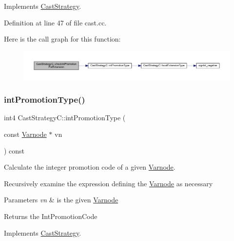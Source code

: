 Implements \mbox{\hyperlink{class_cast_strategy_a1d44ad4691a30115228ae37533d2c38d}{Cast\+Strategy}}.



Definition at line 47 of file cast.\+cc.

Here is the call graph for this function\+:
\nopagebreak
\begin{figure}[H]
\begin{center}
\leavevmode
\includegraphics[width=350pt]{class_cast_strategy_c_a567cf30b699d20f9652e0edb437a5994_cgraph}
\end{center}
\end{figure}
\mbox{\label{class_cast_strategy_c_a628af1b296211f1cc9add47af576ea2b}} 
\subsubsection{\texorpdfstring{intPromotionType()}{intPromotionType()}}
{\footnotesize\ttfamily int4 Cast\+Strategy\+C\+::int\+Promotion\+Type (\begin{DoxyParamCaption}\item[{const \mbox{\hyperlink{class_varnode}{Varnode}} $\ast$}]{vn }\end{DoxyParamCaption}) const\hspace{0.3cm}{\ttfamily [virtual]}}



Calculate the integer promotion code of a given \mbox{\hyperlink{class_varnode}{Varnode}}. 

Recursively examine the expression defining the \mbox{\hyperlink{class_varnode}{Varnode}} as necessary 
\begin{DoxyParams}{Parameters}
{\em vn} & is the given \mbox{\hyperlink{class_varnode}{Varnode}} \\
\hline
\end{DoxyParams}
\begin{DoxyReturn}{Returns}
the Int\+Promotion\+Code 
\end{DoxyReturn}


Implements \mbox{\hyperlink{class_cast_strategy_a69b81cbe074f60bf95bd8823e7bf191c}{Cast\+Strategy}}.



